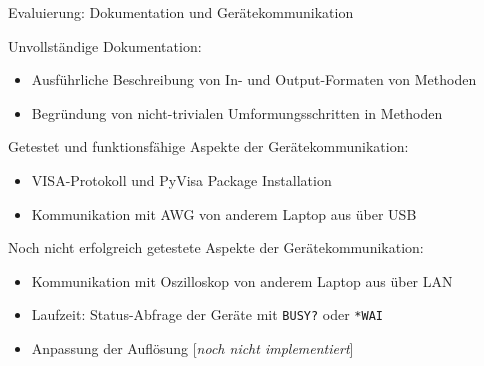 \begin{frame}{Evaluierung: Dokumentation und Gerätekommunikation}

Unvollständige Dokumentation:
\begin{itemize}
	\item Ausführliche Beschreibung von In- und Output-Formaten von Methoden
	\item Begründung von nicht-trivialen Umformungsschritten in Methoden
\end{itemize}

Getestet und funktionsfähige Aspekte der Gerätekommunikation:
\begin{itemize}
	\item VISA-Protokoll und PyVisa Package Installation 
	\item Kommunikation mit AWG von anderem Laptop aus über USB
\end{itemize}

Noch nicht erfolgreich getestete Aspekte der Gerätekommunikation:
\begin{itemize}
	\item Kommunikation mit Oszilloskop von anderem Laptop aus über LAN
	\item Laufzeit: Status-Abfrage der Geräte mit \lstinline{BUSY?} oder \lstinline{*WAI}
	\item Anpassung der Auflösung [\textit{noch nicht implementiert}]
\end{itemize}

\end{frame}



